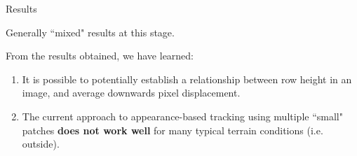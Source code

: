 \documentclass[10pt, compress]{beamer}
\begin{document}
\begin{frame}{Results}

Generally ``mixed" results at this stage. \\ \vspace{0.5cm}

From the results obtained, we have learned:

\begin{enumerate}
  \item It is possible to potentially establish a relationship between row height in an image, and average downwards pixel displacement.
  \item The current approach to appearance-based tracking using multiple ``small" patches \textbf{does not work well} for many typical terrain conditions (i.e. outside). 
\end{enumerate}

\end{frame}
\end{document}
